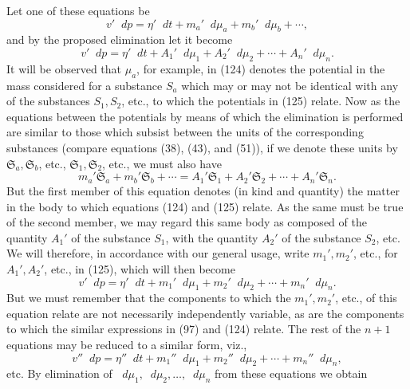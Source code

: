 \documentclass[11pt]{article}
\newcommand{\dd}{\mathop{}\!d}
\newcommand{\unit}[1]{\mathfrak{S}_{#1}}
\begin{document}
Let one of these equations be
\begin{equation}
v'\dd p=\eta'\dd t+m_a'\dd\mu_a+m_b'\dd\mu_b+\cdots,
\end{equation}
and by the proposed elimination let it become
\begin{equation}
v'\dd p=\eta'\dd t+A_1'\dd\mu_1+A_2'\dd\mu_2+\cdots+A_n'\dd\mu_n.
\end{equation}
It will be observed that \(\mu_a\), for example, in (124) denotes the potential in the mass considered for a substance \(S_a\) which may or may not be identical with any of the substances \(S_1,S_2\), etc., to which the potentials in (125) relate. Now as the equations between the potentials by means of which the elimination is performed are similar to those which subsist between the units of the corresponding substances (compare equations (38), (43), and (51)), if we denote these units by \(\unit{a},\unit{b}\), etc., \(\unit{1},\unit{2}\), etc., we must also have
\begin{equation}
m_a'\unit{a}+m_b'\unit{b}+\cdots=A_1'\unit{1}+A_2'\unit{2}+\cdots+A_n'\unit{n}.
\end{equation}
But the first member of this equation denotes (in kind and quantity) the matter in the body to which equations (124) and (125) relate. As the same must be true of the second member, we may regard this same body as composed of the quantity \(A_1'\) of the substance \(S_1\), with the quantity \(A_2'\) of the substance \(S_2\), etc. We will therefore, in accordance with our general usage, write \(m_1',m_2'\), etc., for \(A_1',A_2'\), etc., in (125), which will then become
\begin{equation}
v'\dd p=\eta'\dd t+m_1'\dd\mu_1+m_2'\dd\mu_2+\cdots+m_n'\dd\mu_n.
\end{equation}
But we must remember that the components to which the \(m_1',m_2'\), etc., of this equation relate are not necessarily independently variable, as are the components to which the similar expressions in (97) and (124) relate. The rest of the \(n+1\) equations may be reduced to a similar form, viz.,
\begin{equation}
v''\dd p=\eta''\dd t+m_1''\dd\mu_1+m_2''\dd\mu_2+\cdots+m_n''\dd\mu_n,
\end{equation}
etc. By elimination of \(\dd\mu_1,\dd\mu_2,\ldots,\dd\mu_n\) from these equations we obtain
\end{document}
